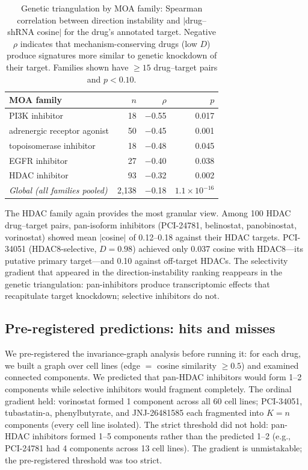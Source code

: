 \documentclass{article}
\begin{document}
\begin{table}[t]
\centering
\caption{Genetic triangulation by MOA family: Spearman correlation between
direction instability and $|$drug--shRNA cosine$|$ for the drug's annotated
target. Negative $\rho$ indicates that mechanism-conserving drugs (low $D$)
produce signatures more similar to genetic knockdown of their target.
Families shown have $\geq 15$ drug--target pairs and $p < 0.10$.}
\label{tab:triangulation}
\small
\begin{tabular}{lrrr}
\toprule
MOA family & $n$ & $\rho$ & $p$ \\
\midrule
PI3K inhibitor & 18 & $-$0.55 & 0.017 \\
adrenergic receptor agonist & 50 & $-$0.45 & 0.001 \\
topoisomerase inhibitor & 18 & $-$0.48 & 0.045 \\
EGFR inhibitor & 27 & $-$0.40 & 0.038 \\
HDAC inhibitor & 93 & $-$0.32 & 0.002 \\
\midrule
\emph{Global (all families pooled)} & 2{,}138 & $-$0.18 & $1.1 \times 10^{-16}$ \\
\bottomrule
\end{tabular}
\end{table}

The HDAC family again provides the most granular view. Among 100 HDAC
drug--target pairs, pan-isoform inhibitors (PCI-24781, belinostat,
panobinostat, vorinostat) showed mean $|$cosine$|$ of 0.12--0.18 against
their HDAC targets. PCI-34051 (HDAC8-selective, $D = 0.98$) achieved only
0.037 cosine with HDAC8---its putative primary target---and 0.10 against
off-target HDACs. The selectivity gradient that appeared in the
direction-instability ranking reappears in the genetic triangulation:
pan-inhibitors produce transcriptomic effects that recapitulate target
knockdown; selective inhibitors do not.

\subsection{Pre-registered predictions: hits and misses}

We pre-registered the invariance-graph analysis before running it: for
each drug, we built a graph over cell lines (edge $=$ cosine similarity
$\geq 0.5$) and examined connected components. We predicted that
pan-HDAC inhibitors would form 1--2 components while selective
inhibitors would fragment completely. The ordinal gradient held:
vorinostat formed 1 component across all 60 cell lines; PCI-34051,
tubastatin-a, phenylbutyrate, and JNJ-26481585 each fragmented into
$K = n$ components (every cell line isolated). The strict threshold
did not hold: pan-HDAC inhibitors formed 1--5 components rather
than the predicted 1--2 (e.g., PCI-24781 had 4 components across
13 cell lines). The gradient is unmistakable; the pre-registered
threshold was too strict.
\end{document}
